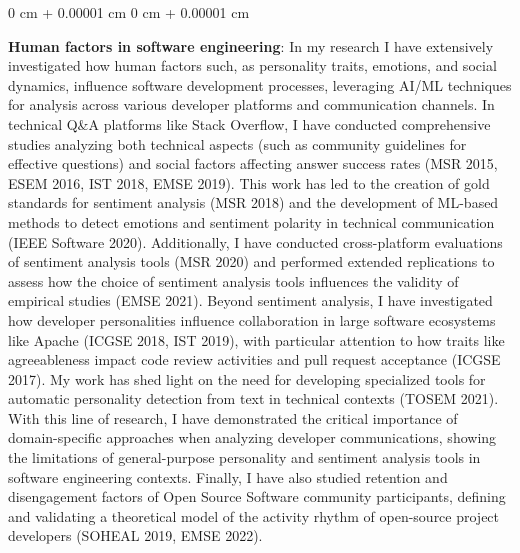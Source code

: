 \documentclass[10pt, a4paper]{article}
\newenvironment{onecolentry}{
    \begin{adjustwidth}{
        0 cm + 0.00001 cm
    }{
        0 cm + 0.00001 cm
    }
}{
    \end{adjustwidth}
} %
\begin{document}
        \vspace{0.2 cm}

        \begin{onecolentry}
            \textbf{Human factors in software engineering}: In my research I have extensively investigated how human factors such, as personality traits, emotions, and social dynamics, influence software development processes, leveraging AI/ML techniques for analysis across various developer platforms and communication channels. In technical Q\&A platforms like Stack Overflow, I have conducted comprehensive studies analyzing both technical aspects (such as community guidelines for effective questions) and social factors affecting answer success rates (MSR 2015, ESEM 2016, IST 2018, EMSE 2019). This work has led to the creation of gold standards for sentiment analysis (MSR 2018) and the development of ML-based methods to detect emotions and sentiment polarity in technical communication (IEEE Software 2020). Additionally, I have conducted cross-platform evaluations of sentiment analysis tools (MSR 2020) and performed extended replications to assess how the choice of sentiment analysis tools influences the validity of empirical studies (EMSE 2021). Beyond sentiment analysis, I have investigated how developer personalities influence collaboration in large software ecosystems like Apache (ICGSE 2018, IST 2019), with particular attention to how traits like agreeableness impact code review activities and pull request acceptance (ICGSE 2017). My work has shed light on the need for developing specialized tools for automatic personality detection from text in technical contexts (TOSEM 2021). With this line of research, I have demonstrated the critical importance of domain-specific approaches when analyzing developer communications, showing the limitations of general-purpose personality and sentiment analysis tools in software engineering contexts. Finally, I have also studied retention and disengagement factors of Open Source Software community participants, defining and validating a theoretical model of the activity rhythm of open-source project developers (SOHEAL 2019, EMSE 2022).
        \end{onecolentry}

        \vspace{0.2 cm}
\end{document}
